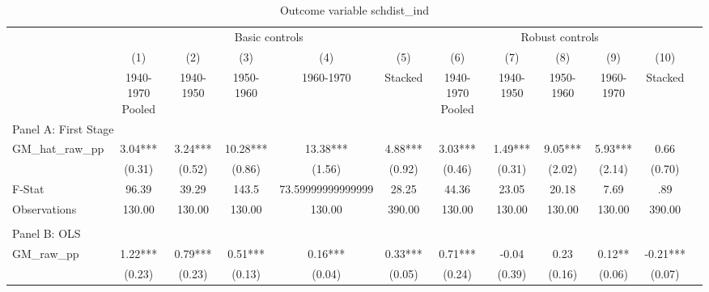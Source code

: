  \begin{table}[htbp]\centering {} \begin{threeparttable} \caption{Outcome variable schdist\_ind } \begin{tabular}{l*{11}{c}} \toprule
          &\multicolumn{5}{c}{Basic controls}                                   &\multicolumn{5}{c}{Robust controls}                                  \\\cmidrule(lr){2-6}\cmidrule(lr){7-11}
          &\multicolumn{1}{c}{(1)}&\multicolumn{1}{c}{(2)}&\multicolumn{1}{c}{(3)}&\multicolumn{1}{c}{(4)}&\multicolumn{1}{c}{(5)}&\multicolumn{1}{c}{(6)}&\multicolumn{1}{c}{(7)}&\multicolumn{1}{c}{(8)}&\multicolumn{1}{c}{(9)}&\multicolumn{1}{c}{(10)}\\
          &\multicolumn{1}{c}{1940-1970 Pooled}&\multicolumn{1}{c}{1940-1950}&\multicolumn{1}{c}{1950-1960}&\multicolumn{1}{c}{1960-1970}&\multicolumn{1}{c}{Stacked}&\multicolumn{1}{c}{1940-1970 Pooled}&\multicolumn{1}{c}{1940-1950}&\multicolumn{1}{c}{1950-1960}&\multicolumn{1}{c}{1960-1970}&\multicolumn{1}{c}{Stacked}\\
\cmidrule(lr){1-11}
\multicolumn{10}{l}{Panel A: First Stage}\\
\cmidrule(lr){1-11}
GM\_hat\_raw\_pp&      3.04***&      3.24***&     10.28***&     13.38***&      4.88***&      3.03***&      1.49***&      9.05***&      5.93***&      0.66   \\
          &    (0.31)   &    (0.52)   &    (0.86)   &    (1.56)   &    (0.92)   &    (0.46)   &    (0.31)   &    (2.02)   &    (2.14)   &    (0.70)   \\
\midrule
F-Stat    &     96.39   &     39.29   &     143.5   &73.59999999999999   &     28.25   &     44.36   &     23.05   &     20.18   &      7.69   &       .89   \\
Observations&    130.00   &    130.00   &    130.00   &    130.00   &    390.00   &    130.00   &    130.00   &    130.00   &    130.00   &    390.00   \\
\cmidrule[\heavyrulewidth](lr){1-11} \\ \cmidrule[\heavyrulewidth](lr){1-11}
\multicolumn{10}{l}{Panel B: OLS}\\
\cmidrule(lr){1-11}
GM\_raw\_pp &      1.22***&      0.79***&      0.51***&      0.16***&      0.33***&      0.71***&     -0.04   &      0.23   &      0.12** &     -0.21***\\
          &    (0.23)   &    (0.23)   &    (0.13)   &    (0.04)   &    (0.05)   &    (0.24)   &    (0.39)   &    (0.16)   &    (0.06)   &    (0.07)   \\

\end{tabular}
\end{threeparttable}
\end{table}
